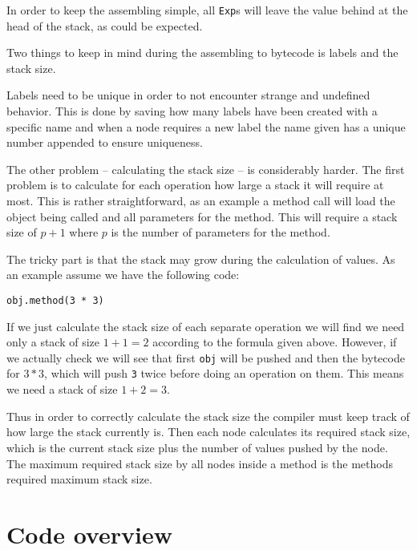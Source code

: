 \documentclass[a4paper]{article}
\begin{document}
In order to keep the assembling simple, all \texttt{Exp}s will leave the value behind at the head
of the stack, as could be expected.

Two things to keep in mind during the assembling to bytecode is labels and the stack size.

Labels need to be unique in order to not encounter strange and undefined behavior. This is done
by saving how many labels have been created with a specific name and when
a node requires a new label the name given has a unique number appended to ensure uniqueness.

The other problem -- calculating the stack size -- is considerably harder. The first problem
is to calculate for each operation how large a stack it will require at most. This is
rather straightforward, as an example a method call will load the object being called
and all parameters for the method. This will require a stack size of $p + 1$ where $p$
is the number of parameters for the method.

The tricky part is that the stack may grow during the calculation of values. As an example
assume we have the following code:

\begin{lstlisting}
obj.method(3 * 3)
\end{lstlisting}

If we just calculate the stack size of each separate operation we will find we need only
a stack of size $1 + 1 = 2$ according to the formula given above. However, if we actually
check we will see that first \texttt{obj} will be pushed and then the bytecode for $3 * 3$,
which will push \texttt{3} twice before doing an operation on them. This means we need a
stack of size $1+2 = 3$.

Thus in order to correctly calculate the stack size the compiler must keep track of how
large the stack currently is. Then each node calculates its required stack size, which is
the current stack size plus the number of values pushed by the node. The maximum required
stack size by all nodes inside a method is the methods required maximum stack size.

\section{Code overview}
\end{document}
